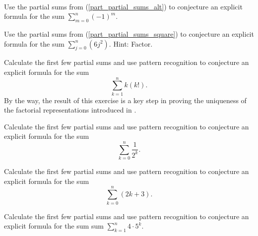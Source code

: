 \begin{exer}[\exerU] %
\label{exer_sum_conj_alt_sum_sq}
~
    \begin{exerpart}
        \item Use the partial sums from  (\ref{part_partial_sums_alt}) to conjecture an explicit formula for the sum $\displaystyle \sum_{m=0}^{n}(-1)^m$. %
            
        \item Use the partial sums from  (\ref{part_partial_sums_square}) to conjecture an explicit formula for the sum $\displaystyle \sum_{j=0}^{n}(6j^2)$.  Hint: Factor.
    \end{exerpart}
\end{exer}

\begin{exer}[\exerU] %
\label{exer_sum_conj_factorials}
    Calculate the first few partial sums and use pattern recognition to conjecture an explicit formula for the sum
            $$ \sum_{k=1}^nk(k!).$$
    By the way, the result of this exercise is a key step in proving the uniqueness of the factorial representations introduced in . 
\end{exer}

\begin{exer}[\exerU] %
\label{exer_sum_conj_recip_powers2}
    Calculate the first few partial sums and use pattern recognition to conjecture an explicit formula for the sum 
        $$\displaystyle \sum_{k=0}^n\frac{1}{2^k}.$$    
\end{exer}

\begin{exer}[\exerU] %
\label{exer_sum_conj_new_odds}
    Calculate the first few partial sums and use pattern recognition to conjecture an explicit formula for the sum 
        $$\displaystyle \sum_{k=0}^n(2k+3).$$
\end{exer}

\begin{exer}[\exerU] %
\label{exer_sum_conj_powers5}
    Calculate the first few partial sums and use pattern recognition to conjecture an explicit formula for the sum 
    sum $\displaystyle \sum_{k=1}^n 4 \cdot 5^k$.
\end{exer}

